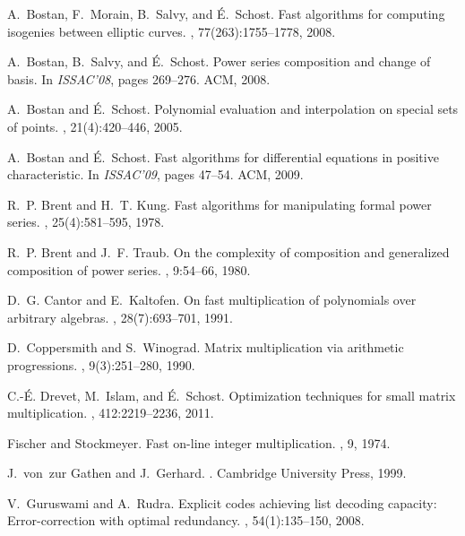 \documentclass[]{sig-alternate}
\begin{document}
{\begin{thebibliography}{10}
A.~Bostan, F.~Morain, B.~Salvy, and {\'E}.~Schost.
\newblock Fast algorithms for computing isogenies between elliptic curves.
, 77(263):1755--1778, 2008.

A.~Bostan, B.~Salvy, and {\'E}.~Schost.
\newblock Power series composition and change of basis.
\newblock In {\em ISSAC'08}, pages 269--276. ACM, 2008.

A.~Bostan and {\'E}.~Schost.
\newblock Polynomial evaluation and interpolation on special sets of points.
, 21(4):420--446, 2005.

A.~Bostan and {\'E}.~Schost.
\newblock Fast algorithms for differential equations in positive
  characteristic.
\newblock In {\em ISSAC'09}, pages 47--54. ACM, 2009.

R.~P. Brent and H.~T. Kung.
\newblock Fast algorithms for manipulating formal power series.
, 25(4):581--595, 1978.

R.~P. Brent and J.~F. Traub.
\newblock On the complexity of composition and generalized composition of power
  series.
, 9:54--66, 1980.

D.~G. Cantor and E.~Kaltofen.
\newblock On fast multiplication of polynomials over arbitrary algebras.
, 28(7):693--701, 1991.

D.~Coppersmith and S.~Winograd.
\newblock Matrix multiplication via arithmetic progressions.
, 9(3):251--280, 1990.

C.-{\'E}. Drevet, M.~Islam, and {\'E}.~Schost.
\newblock Optimization techniques for small matrix multiplication.
, 412:2219--2236, 2011.

Fischer and Stockmeyer.
\newblock Fast on-line integer multiplication.
, 9, 1974.

J.~von~zur Gathen and J.~Gerhard.
.
\newblock Cambridge University Press, 1999.

V.~Guruswami and A.~Rudra.
\newblock Explicit codes achieving list decoding capacity: Error-correction
  with optimal redundancy.
, 54(1):135--150, 2008.


\end{thebibliography}}
\end{document}
